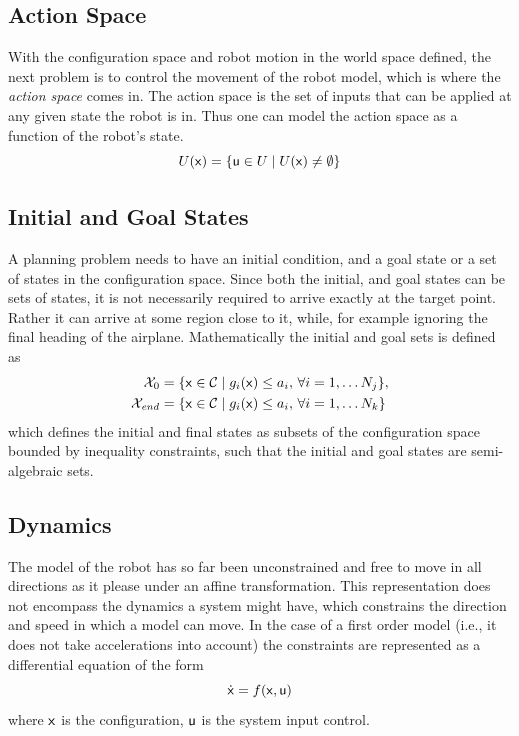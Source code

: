 \subsection{Action Space}

With the configuration space and robot motion in the world space defined, the
next problem is to control the movement of the robot model, which is where the
\textit{action space} comes in. The action space is the set of inputs that can
be applied at any given state the robot is in. Thus one can model the action
space as a function of the robot's state.
\[
  U({\mathbf{\mathsf{x}}}) = \lbrace{\mathbf{\mathsf{u}}} \in U \mid
    U({\mathbf{\mathsf{x}}}) \neq \emptyset \rbrace
\]

\subsection{Initial and Goal States}

A planning problem needs to have an initial condition, and a goal state or a set
of states in the configuration space. Since both the initial, and goal states
can be sets of states, it is not necessarily required to arrive exactly at the
target point. Rather it can arrive at some region close to it, while, for
example ignoring the final heading of the airplane. Mathematically the initial
and goal sets is defined as
\begin{align*}
  \mathcal{X}_0 &= \lbrace {\mathbf{\mathsf{x}}} \in \mathcal{C}{} \mid g_i({\mathbf{\mathsf{x}}}) \leq a_i,
                  \, \forall i = 1,\ldots N_j\rbrace, \\
  \mathcal{X}_{\mathit{end}} &= \lbrace {\mathbf{\mathsf{x}}} \in \mathcal{C}{} \mid g_i({\mathbf{\mathsf{x}}}) \leq
                      a_i, \, \forall i = 1,\ldots N_k\rbrace
\end{align*}
which defines the initial and final states as subsets of the configuration space
bounded by inequality constraints, such that the initial and goal states are
semi-algebraic sets.

\subsection{Dynamics}

The model of the robot has so far been unconstrained and free to move in all
directions as it please under an affine transformation. This representation does
not encompass the dynamics a system might have, which constrains the direction
and speed in which a model can move. In the case of a first order model (i.e.,
it does not take accelerations into account) the constraints are represented as
a differential equation of the form
\[
  \dot{{\mathbf{\mathsf{x}}}} = f({\mathbf{\mathsf{x}}},{\mathbf{\mathsf{u}}})
\]
where \({\mathbf{\mathsf{x}}}\) is the configuration, \({\mathbf{\mathsf{u}}}\) is the system input
control.

